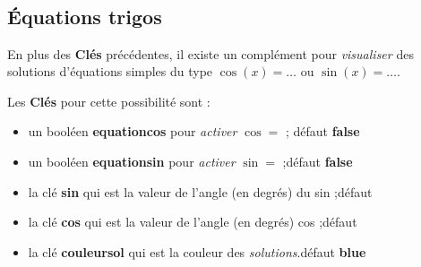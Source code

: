 \documentclass{article}
\newcommand\Cle[1]{{\bfseries\sffamily\textlangle #1\textrangle}}
\begin{document}
\pagebreak

\begin{codetex}
\begin{center}
	\begin{tikzpicture}[line join=bevel]
			\cercletrigoPL[rayon=2.5,affvaleurs=false,decal=8pt]
		\end{tikzpicture}
	~~~~
	\begin{tikzpicture}[line join=bevel]
			\cercletrigoPL[rayon=2.5,affangles=false]
		\end{tikzpicture}
	~~~~
	\begin{tikzpicture}[line join=bevel]
			\cercletrigoPL[rayon=2.5,moinspi=false,couleurfond=orange!15]
		\end{tikzpicture}
\end{center}
\end{codetex}

\begin{codesortie}
\begin{center}
	\begin{tikzpicture}[line join=bevel]
			\cercletrigoPL[rayon=2.5,affvaleurs=false,decal=8pt]
		\end{tikzpicture}
	~~~~
	\begin{tikzpicture}[line join=bevel]
			\cercletrigoPL[rayon=2.5,affangles=false]
		\end{tikzpicture}
	~~~~
	\begin{tikzpicture}[line join=bevel]
			\cercletrigoPL[rayon=2.5,moinspi=false,couleurfond=orange!15,taillevaleurs=\tiny]
		\end{tikzpicture}
\end{center}
\end{codesortie}

\subsection{Équations trigos}

\begin{codeinfo}
En plus des \Cle{Clés} précédentes, il existe un complément pour \textit{visualiser} des solutions d'équations simples du type $\cos(x)=\ldots$ ou $\sin(x)=\ldots$.
\end{codeinfo}

\begin{codecles}
Les \Cle{Clés} pour cette possibilité sont :

\begin{itemize}
	\item un booléen \Cle{equationcos} pour \textit{activer} \og $\cos=$ \fg; \hfill{}défaut \Cle{false}
	\item un booléen \Cle{equationsin} pour \textit{activer} \og $\sin=$ \fg;\hfill{}défaut \Cle{false}
	\item la clé \Cle{sin} qui est la valeur de l'angle (en degrés) du sin ;\hfill{}défaut \Cle{30}
	\item la clé \Cle{cos} qui est la valeur de l'angle (en degrés) cos ;\hfill{}défaut \Cle{45}
	\item la clé \Cle{couleursol} qui est la couleur des \textit{solutions}.\hfill{}défaut \Cle{blue}
\end{itemize}
\end{codecles}
\end{document}
